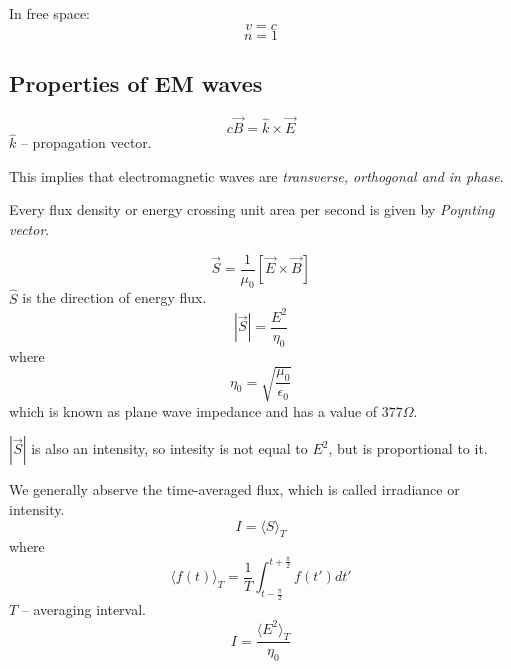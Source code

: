 \documentclass[10pt]{article}
\begin{document}
In free space:
\begin{equation*}
v=c
\end{equation*}
\begin{equation*}
n=1
\end{equation*}

\subsection*{Properties of EM waves}
\begin{equation}
\boxed{c\vec{B} = \hat{k} \times \vec{E}}
\end{equation}
$\hat{k}$ -- propagation vector.

This implies that electromagnetic waves are \textsl{transverse, orthogonal and in phase}.

Every flux density or energy crossing unit area per second is given by \textit{Poynting vector}.

\begin{equation}
\boxed{\vec{S}=\frac{1}{\mu_0}[\vec{E} \times \vec{B}]}
\end{equation}
$\hat{S}$ is the direction of energy flux.
\begin{equation*}
|\vec{S}| = \frac{E^2}{\eta_0}
\end{equation*}
where
\begin{equation*}
\eta_0 = \sqrt{\frac{\mu_0}{\epsilon_0}}
\end{equation*}
which is known as plane wave impedance and has a value of $377\Omega$.

$|\vec{S}|$ is also an intensity, so intesity is not equal to $E^2$, but is proportional to it.

We generally abserve the time-averaged flux, which is called irradiance or intensity.
\begin{equation*}
I = \langle S \rangle_T
\end{equation*}
where
\begin{equation*}
\langle f(t) \rangle_T = \frac{1}{T} \int^{t+\frac{\pi}{2}} _{t-\frac{\pi}{2}} f(t')dt'
\end{equation*}
$T$ -- averaging interval.
\begin{equation*}
I = \frac{\langle E^2 \rangle_T}{\eta_0}
\end{equation*}
\end{document}
